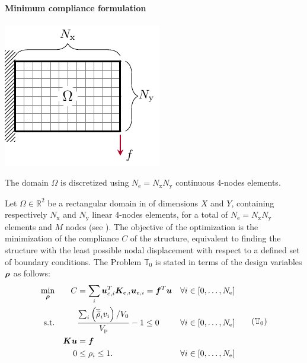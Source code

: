 \paragraph{Minimum compliance formulation}
\begin{marginfigure}
    \centering
    \includegraphics{figures/03_comparison_TO_TTO/01_contin_mesh/c_mesh.pdf}
    \caption{The domain $\Omega$ is discretized using $N_\text{e}=N_\text{x} N_\text{y}$ continuous 4-nodes elements.}
    \label{fig:03_mesh_c}
\end{marginfigure}
Let $\Omega \in \mathbb{R}^2$ be a rectangular domain in of dimensions $X$ and $Y$, containing respectively $N_\text{x}$ and $N_\text{y}$ linear 4-nodes elements, for a total of $N_\text{e}=N_\text{x} N_\text{y}$ elements and $M$ nodes (see ). The objective of the optimization is the minimization of the compliance $C$ of the structure, equivalent to finding the structure with the least possible nodal displacement with respect to a defined set of boundary conditions. The Problem $\mathbb{T}_0$ is stated in terms of the design variables $\bm{\rho}$ as follows:
\begin{equation}
    \begin{aligned}
    \min_{\vect{\rho}}         && C &= \sum_{i} \vect{u}_{e,i}^T \matr{K}_{e,i} \vect{u}_{e,i}=\vect{f}^T\vect{u}&& \forall i \in [0,\dots,N_\text{e}]                         \\
    \textrm{s.t.}   && & \frac{\sum_{i} \left(\rhophys_i v_i \right) / V_0}{V_\text{p}} - 1 \leq 0 && \forall i \in [0,\dots,N_\text{e}] \\
    && \matr{K}\vect{u} &= \vect{f} &&\\
    && 0 &\leq \rho_i \leq 1. && \forall i \in [0,\dots,N_\text{e}] \\
    \end{aligned}
    \tag{$\mathbb{T}_0$}
    \label{eq:03_prob-comp}
\end{equation}
